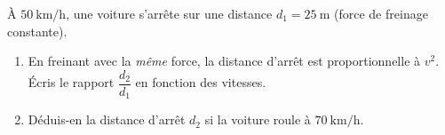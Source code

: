 \documentclass[11pt,a4paper]{article}
\begin{document}
\begin{exo}
À $\qty{50}{\kilo\metre\per\hour}$, une voiture s'arrête sur une distance $d_1=\qty{25}{\metre}$
(force de freinage constante).
\begin{enumerate}[label=\alph*)]
  \item En freinant avec la \emph{même} force, la distance d'arrêt est proportionnelle à $v^2$.
        Écris le rapport $\dfrac{d_2}{d_1}$ en fonction des vitesses.
  \item Déduis-en la distance d'arrêt $d_2$ si la voiture roule à $\qty{70}{\kilo\metre\per\hour}$.
\end{enumerate}
\end{exo}
\end{document}
